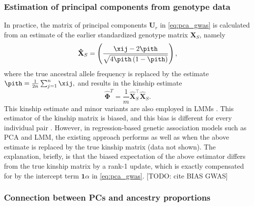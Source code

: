 \documentclass[11pt]{article}
\begin{document}
\subsubsection{Estimation of principal components from genotype data}

In practice, the matrix of principal components $\mathbf{U}_r$ in \cref{eq:pca_gwas} is calculated from an estimate of the earlier standardized genotype matrix $\mathbf{X}_S$, namely
\begin{equation*}
  \mathbf{\hat{X}}_S
  =
  \left(
    \frac{
      \xij - 2 \pith
    }{
      \sqrt{4 \pith \left( 1 - \pith \right)}
    }
  \right)
  ,
\end{equation*}
where the true ancestral allele frequency \pit is replaced by the estimate
$
\pith = \frac{1}{2n} \sum_{j = 1}^n \xij,
$
and results in the kinship estimate
\begin{equation}
  \label{eq:kinship_std}
  \mathbf{\hat{\Phi}}^T
  =
  \frac{1}{m}
  \mathbf{\hat{X}}_S^\intercal
  \mathbf{\hat{X}}_S
  .
\end{equation}
This kinship estimate and minor variants are also employed in LMMs \citep{yang_gcta:_2011}.
This estimator of the kinship matrix is biased, and this bias is different for every individual pair \citep{ochoa_estimating_2021, ochoa_human}.
However, in regression-based genetic association models such as PCA and LMM, the existing approach performs as well as when the above estimate is replaced by the true kinship matrix (data not shown).
The explanation, briefly, is that the biased expectation of the above estimator differs from the true kinship matrix by a rank-1 update, which is exactly compensated for by the intercept term $\mathbf{1} \alpha$ in \cref{eq:pca_gwas}.
[TODO: cite BIAS GWAS]

\subsubsection{Connection between PCs and ancestry proportions}
\end{document}
